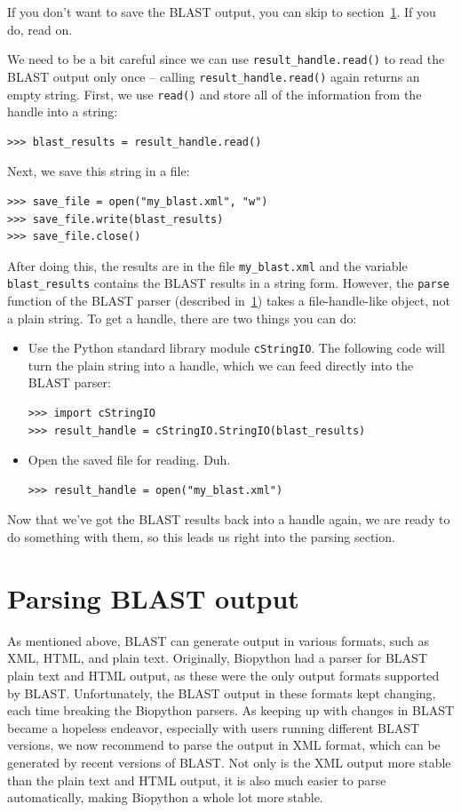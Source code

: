 \documentclass{report}
\begin{document}
If you don't want to save the BLAST output, you can skip to
section~\ref{sec:parsing-blast}. If you do, read on.

We need to be a bit careful since we can use \verb|result_handle.read()| to
read the BLAST output only once -- calling \verb|result_handle.read()| again
returns an empty string. First, we use \verb|read()| and store all of
the information from the handle into a string:

\begin{verbatim}
>>> blast_results = result_handle.read()
\end{verbatim}

Next, we save this string in a file:

\begin{verbatim}
>>> save_file = open("my_blast.xml", "w")
>>> save_file.write(blast_results)
>>> save_file.close()
\end{verbatim}

After doing this, the results are in the file \verb|my_blast.xml| and the
variable \verb|blast_results| contains the BLAST results in a string
form. However, the \verb|parse| function of the BLAST parser (described
in~\ref{sec:parsing-blast}) takes a file-handle-like object, not a
plain string. To get a handle, there are two things you can do:
\begin{itemize}
\item Use the Python standard library module \verb|cStringIO|. The
following code will turn the plain string into a handle, which we can
feed directly into the BLAST parser:
\begin{verbatim}
>>> import cStringIO
>>> result_handle = cStringIO.StringIO(blast_results)
\end{verbatim}
\item Open the saved file for reading. Duh.
\begin{verbatim}
>>> result_handle = open("my_blast.xml")
\end{verbatim}
\end{itemize}

Now that we've got the BLAST results back into a handle again, we are ready
to do something with them, so this leads us right into the parsing section.

\section{Parsing BLAST output}
\label{sec:parsing-blast}

As mentioned above, BLAST can generate output in various formats,
such as XML, HTML, and plain text. Originally, Biopython had a parser for
BLAST plain text and HTML output, as these were the only output formats supported
by BLAST. Unfortunately, the BLAST output in these formats kept changing,
each time breaking the Biopython parsers. As keeping up with changes in BLAST
became a hopeless endeavor, especially with users running different BLAST
versions, we now recommend to parse the output in XML format, which can be
generated by recent versions of BLAST. Not only is the XML output more stable
than the plain text and HTML output, it is also much easier to parse
automatically, making Biopython a whole lot more stable.
\end{document}

